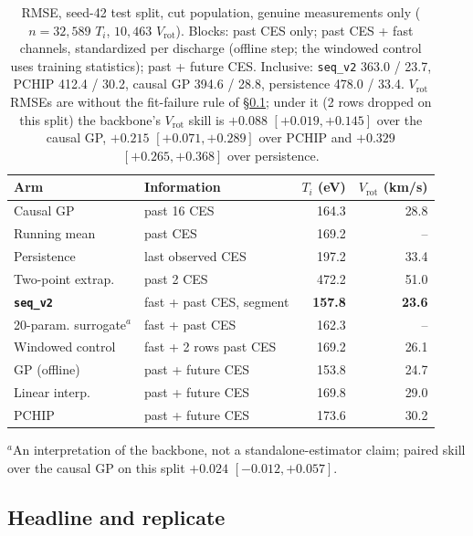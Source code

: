 \documentclass[10pt,twocolumn,letterpaper]{article}
\newcommand{\Ti}{\ensuremath{T_i}}
\newcommand{\Vrot}{\ensuremath{V_\mathrm{rot}}}
\newcommand{\seqv}{\texttt{seq\_v2}}
\begin{document}
\begin{table}[t]
  \centering
  \caption{RMSE, seed-42 test split, cut population, genuine measurements only
  ($n = 32{,}589$ \Ti{}, $10{,}463$ \Vrot{}). Blocks: past CES only; past CES + fast
  channels, standardized per discharge (offline step; the windowed control uses
  training statistics); past + future CES. Inclusive:
  \seqv{} 363.0 / 23.7, PCHIP 412.4 / 30.2, causal GP 394.6 / 28.8, persistence
  478.0 / 33.4. \Vrot{} RMSEs are without the fit-failure rule of
  \S\ref{sec:res:headline}; under it (2 rows dropped on this split) the backbone's
  \Vrot{} skill is $+0.088$ $[+0.019, +0.145]$ over the causal GP, $+0.215$
  $[+0.071, +0.289]$ over PCHIP and $+0.329$ $[+0.265, +0.368]$ over persistence.}
  \label{tab:ladder}
  \footnotesize
  \setlength{\tabcolsep}{3.3pt}
  \begin{tabular}{llrr}
    \toprule
    Arm & Information & \Ti{} (eV) & \Vrot{} (km/s) \\
    \midrule
    Causal GP & past 16 CES & 164.3 & 28.8 \\
    Running mean & past CES & 169.2 & -- \\
    Persistence & last observed CES & 197.2 & 33.4 \\
    Two-point extrap. & past 2 CES & 472.2 & 51.0 \\
    \midrule
    \textbf{\seqv{}} & fast + past CES, segment & \textbf{157.8} & \textbf{23.6} \\
    20-param. surrogate$^{a}$ & fast + past CES & 162.3 & -- \\
    Windowed control & fast + 2 rows past CES & 169.2 & 26.1 \\
    \midrule
    GP (offline) & past + future CES & 153.8 & 24.7 \\
    Linear interp. & past + future CES & 169.8 & 29.0 \\
    PCHIP & past + future CES & 173.6 & 30.2 \\
    \bottomrule
  \end{tabular}

  \smallskip\raggedright\scriptsize $^{a}$An interpretation of the backbone, not a
  standalone-estimator claim; paired skill over the causal GP on this split $+0.024$
  $[-0.012, +0.057]$.
\end{table}

\subsection{Headline and replicate}
\label{sec:res:headline}
\end{document}
